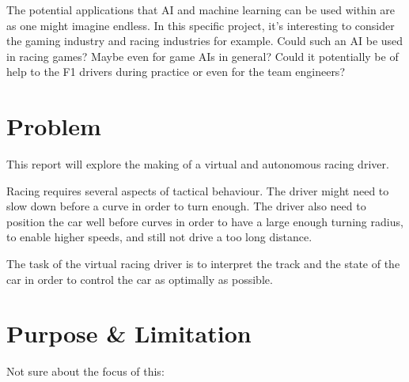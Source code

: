 The potential applications that AI and machine learning can be used within are as one might imagine endless. In this specific project, it's interesting to consider the gaming industry and racing industries for example. Could such an AI be used in racing games? Maybe even for game AIs in general? Could it potentially be of help to the F1 drivers during practice or even for the team engineers? 
\fi

\iffalse

Many problems in computer science and engineering are hard to solve programatically. It may be difficult or costly to develop accurate models and processes. One attempt to solve some of these problems is to use various machine learning techniques. 

If some of the task to model and develop procedures is left to a machine learning process, hopefully less domain knowledge is required by the application developer. 

Example: robot arm movement?

In a similar way, machine learning may be utilised solved many other tasks in the future.

In order to properly make well use of machine learning, one need to understand well how the machine learning process works, what the possibilities are and the limitations on what role it can have.
\fi



\section{Problem}
This report will explore the making of a virtual and autonomous racing driver. 

Racing requires several aspects of tactical behaviour. The driver might need to slow down before a curve in order to turn enough. The driver also need to position the car well before curves in order to have a large enough turning radius, to enable higher speeds, and still not drive a too long distance.

The task of the virtual racing driver is to interpret the track and the state of the car in order to control the car as optimally as possible. 




\section{Purpose \& Limitation}
Not sure about the focus of this:

